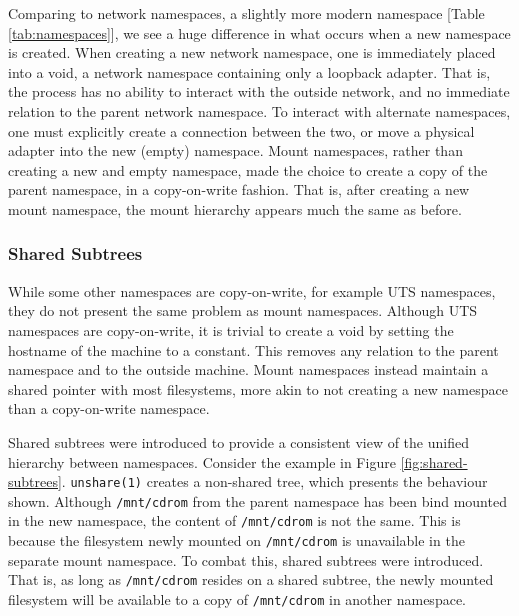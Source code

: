 \documentclass[sigplan]{acmart}
\begin{document}
Comparing to network namespaces, a slightly more modern namespace [Table \ref{tab:namespaces}], we see a huge difference in what occurs when a new namespace is created. When creating a new network namespace, one is immediately placed into a void, a network namespace containing only a loopback adapter. That is, the process has no ability to interact with the outside network, and no immediate relation to the parent network namespace. To interact with alternate namespaces, one must explicitly create a connection between the two, or move a physical adapter into the new (empty) namespace. Mount namespaces, rather than creating a new and empty namespace, made the choice to create a copy of the parent namespace, in a copy-on-write fashion. That is, after creating a new mount namespace, the mount hierarchy appears much the same as before.

\subsubsection{Shared Subtrees}

While some other namespaces are copy-on-write, for example UTS namespaces, they do not present the same problem as mount namespaces. Although UTS namespaces are copy-on-write, it is trivial to create a void by setting the hostname of the machine to a constant. This removes any relation to the parent namespace and to the outside machine. Mount namespaces instead maintain a shared pointer with most filesystems, more akin to not creating a new namespace than a copy-on-write namespace.

Shared subtrees \citep{pai_shared_2005} were introduced to provide a consistent view of the unified hierarchy between namespaces. Consider the example in Figure \ref{fig:shared-subtrees}. \texttt{unshare(1)} creates a non-shared tree, which presents the behaviour shown. Although \texttt{/mnt/cdrom} from the parent namespace has been bind mounted in the new namespace, the content of \texttt{/mnt/cdrom} is not the same. This is because the filesystem newly mounted on \texttt{/mnt/cdrom} is unavailable in the separate mount namespace. To combat this, shared subtrees were introduced. That is, as long as \texttt{/mnt/cdrom} resides on a shared subtree, the newly mounted filesystem will be available to a copy of \texttt{/mnt/cdrom} in another namespace.
\end{document}
